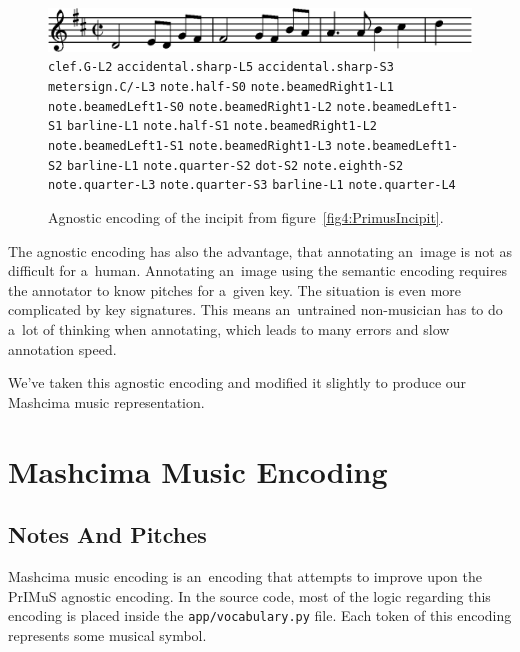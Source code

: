\begin{figure}[h]
    \centering
    \includegraphics[width=140mm]{../img/primus-incipit}
    \verb`clef.G-L2`
    \quad\verb`accidental.sharp-L5`
    \quad\verb`accidental.sharp-S3`
    \quad\verb`metersign.C/-L3`
    \quad\verb`note.half-S0`
    \quad\verb`note.beamedRight1-L1`
    \quad\verb`note.beamedLeft1-S0`
    \quad\verb`note.beamedRight1-L2`
    \quad\verb`note.beamedLeft1-S1`
    \quad\verb`barline-L1`
    \quad\verb`note.half-S1`
    \quad\verb`note.beamedRight1-L2`
    \quad\verb`note.beamedLeft1-S1`
    \quad\verb`note.beamedRight1-L3`
    \quad\verb`note.beamedLeft1-S2`
    \quad\verb`barline-L1`
    \quad\verb`note.quarter-S2`
    \quad\verb`dot-S2`
    \quad\verb`note.eighth-S2`
    \quad\verb`note.quarter-L3`
    \quad\verb`note.quarter-S3`
    \quad\verb`barline-L1`
    \quad\verb`note.quarter-L4`
    \caption{Agnostic encoding of the incipit from figure~\ref{fig4:PrimusIncipit}.}
    \label{fig4:PrimusIncipitAgnosticEncoded}
\end{figure}

The agnostic encoding has also the advantage, that annotating an~image is not as difficult for a~human. Annotating an~image using the semantic encoding requires the annotator to know pitches for a~given key. The situation is even more complicated by key signatures. This means an~untrained non-musician has to do a~lot of thinking when annotating, which leads to many errors and slow annotation speed.

We've taken this agnostic encoding and modified it slightly to produce our Mashcima music representation.


\section{Mashcima Music Encoding}


\subsection{Notes And Pitches}

Mashcima music encoding is an~encoding that attempts to improve upon the PrIMuS agnostic encoding. In the source code, most of the logic regarding this encoding is placed inside the \texttt{app/vocabulary.py} file. Each token of this encoding represents some musical symbol.

